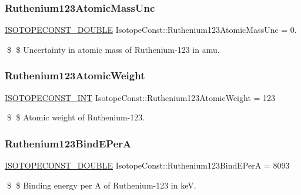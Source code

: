\subsubsection{\texorpdfstring{Ruthenium123\+Atomic\+Mass\+Unc}{Ruthenium123AtomicMassUnc}}
{\footnotesize\ttfamily \mbox{\hyperlink{group___isotope_const-_macros_ga8f45a7272ce02c0b4c65c44636ed719a}{I\+S\+O\+T\+O\+P\+E\+C\+O\+N\+S\+T\+\_\+\+D\+O\+U\+B\+LE}} Isotope\+Const\+::\+Ruthenium123\+Atomic\+Mass\+Unc = 0.}

\$ \$ Uncertainty in atomic mass of Ruthenium-\/123 in amu. \mbox{\label{group___isotope_const-_ruthenium-_ru123_ga0a5f65d764e83d8196297a0f21efc7a5}} 
\subsubsection{\texorpdfstring{Ruthenium123\+Atomic\+Weight}{Ruthenium123AtomicWeight}}
{\footnotesize\ttfamily \mbox{\hyperlink{group___isotope_const-_macros_ga5f18360b3e99483a35c32d789e62621c}{I\+S\+O\+T\+O\+P\+E\+C\+O\+N\+S\+T\+\_\+\+I\+NT}} Isotope\+Const\+::\+Ruthenium123\+Atomic\+Weight = 123}

\$ \$ Atomic weight of Ruthenium-\/123. \mbox{\label{group___isotope_const-_ruthenium-_ru123_ga1194b89058b991ad6af0344cf6aca732}} 
\subsubsection{\texorpdfstring{Ruthenium123\+Bind\+E\+PerA}{Ruthenium123BindEPerA}}
{\footnotesize\ttfamily \mbox{\hyperlink{group___isotope_const-_macros_ga8f45a7272ce02c0b4c65c44636ed719a}{I\+S\+O\+T\+O\+P\+E\+C\+O\+N\+S\+T\+\_\+\+D\+O\+U\+B\+LE}} Isotope\+Const\+::\+Ruthenium123\+Bind\+E\+PerA = 8093}

\$ \$ Binding energy per A of Ruthenium-\/123 in keV. \mbox{\label{group___isotope_const-_ruthenium-_ru123_gab35ff89f9f41b591fa7f7dee749dae56}} 
